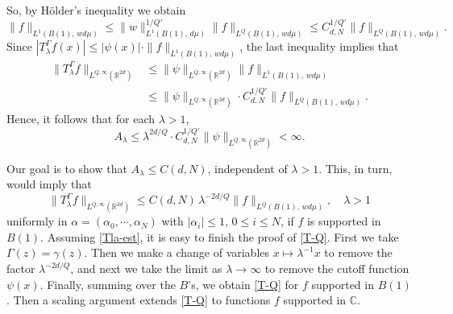 \documentclass[11 pt]{amsart}
\theoremstyle{plain}
\numberwithin{equation}{section}
\theoremstyle{plain}
\numberwithin{equation}{section}
\theoremstyle{remark}
\begin{document}
So, by H\"older's inequality we
obtain
$$ \| f\|_{L^1 (B(1), \, w d\mu )} \le
\| w \|_{L^1(B(1) , \, d\mu )}^{1/Q'} \| f\|_{L^{Q}(B(1),
\, w d\mu )} \le C_{d,N}^{1/Q'} \| f\|_{L^{Q}(B(1), \, w d\mu
)} .$$
Since $| T_{\lambda}^{\Gamma} f (x)| \le |\psi(x)| \cdot \| f\|_{L^1 (B(1) , \, w d\mu )}
$, the last inequality implies that
\begin{align*}
\| T_{\lambda}^{\Gamma} f \|_{L^{Q,\infty}({{\mathbb {R}}}^{2d})} &\le \|
\psi \|_{L^{Q,\infty}({{\mathbb {R}}}^{2d})} \| f\|_{L^1 (B(1) , \, w d\mu )}\\
& \le \|\psi \|_{L^{Q,\infty}({{\mathbb {R}}}^{2d})} \cdot C_{d,N}^{1/Q'} \| f\|_{L^{Q}(B(1) , \, w d\mu
)} .
\end{align*}
Hence, it follows that for each ${\lambda} >1$,
\begin{equation}\label{Alafinite} A_{\lambda} \le {\lambda}^{2d/Q}\cdot
C_{d,N}^{1/Q'} \|\psi\|_{L^{Q,\infty}({{\mathbb {R}}}^{2d})}  < \infty .
\end{equation}

Our goal is to show that $A_{\lambda} \le C(d,N)$, independent of ${\lambda}
>1$. This, in turn, would imply that
\begin{equation}\label{Tla-est}
\| T_{\lambda}^{\Gamma} f \|_{L^{Q,\infty}({{\mathbb {R}}}^{2d})} \le C(d,N) \,
{\lambda}^{-2d/Q} \| f\|_{L^{Q}(B(1), \, w d\mu )}, \quad {\lambda} >1
\end{equation}
uniformly in $\alpha = (\alpha_0, \cdots, \alpha_N)$ with
$|\alpha_i|\le 1$, $0\le i\le N$, if $f$ is supported in $B(1)$.
Assuming \eqref{Tla-est}, it is easy to finish the proof of
\eqref{T-Q}. First we take $\Gamma (z) = \gamma(z)$.
Then we make a change of variables $x\mapsto {\lambda}^{-1} x$ to remove
the factor ${\lambda}^{-2d/Q}$, and next we take the limit as ${\lambda} \rightarrow
\infty$ to remove the cutoff function $\psi(x)$. Finally, summing over the $B$'s, we obtain
\eqref{T-Q} for $f$ supported in $B(1)$. Then a scaling argument extends \eqref{T-Q} to functions $f$ supported in ${{\mathbb {C}}}$.

\medskip
\end{document}
